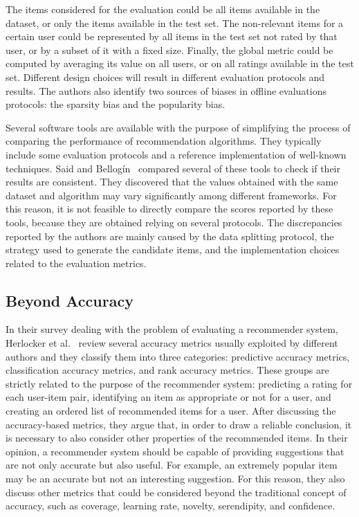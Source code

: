 The items considered for the evaluation could be all items available in the dataset, or only the items available in the test set. The non-relevant items for a certain user could be represented by all items in the test set not rated by that user, or by a subset of it with a fixed size. Finally, the global metric could be computed by averaging its value on all users, or on all ratings available in the test set. Different design choices will result in different evaluation protocols and results. The authors also identify two sources of biases in offline evaluations protocols: the sparsity bias and the popularity bias.

Several software tools are available with the purpose of simplifying the process of comparing the performance of recommendation algorithms. They typically include some evaluation protocols and a reference implementation of well-known techniques. Said and Bellog\'in~\cite{Said2014} compared several of these tools to check if their results are consistent. They discovered that the values obtained with the same dataset and algorithm may vary significantly among different frameworks. For this reason, it is not feasible to directly compare the scores reported by these tools, because they are obtained relying on several protocols. The discrepancies reported by the authors are mainly caused by the data splitting protocol, the strategy used to generate the candidate items, and the implementation choices related to the evaluation metrics.

\subsection{Beyond Accuracy}
\label{soa:sec:beyond}

In their survey dealing with the problem of evaluating a recommender system, Herlocker et al.~\cite{Herlocker2004} review several accuracy metrics usually exploited by different authors and they classify them into three categories: predictive accuracy metrics, classification accuracy metrics, and rank accuracy metrics. These groups are strictly related to the purpose of the recommender system: predicting a rating for each user-item pair, identifying an item as appropriate or not for a user, and creating an ordered list of recommended items for a user. After discussing the accuracy-based metrics, they argue that, in order to draw a reliable conclusion, it is necessary to also consider other properties of the recommended items. In their opinion, a recommender system should be capable of providing suggestions that are not only accurate but also useful. For example, an extremely popular item may be an accurate but not an interesting suggestion. For this reason, they also discuss other metrics that could be considered beyond the traditional concept of accuracy, such as coverage, learning rate, novelty, serendipity, and confidence.


